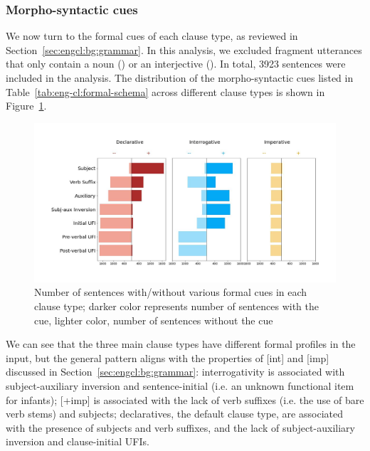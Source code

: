 \subsubsection{Morpho-syntactic cues}
\label{sec:engcl:corpus:formal}
We now turn to the formal cues of each clause type, as reviewed in Section~\ref{sec:engcl:bg:grammar}. In this analysis, we excluded fragment utterances that only contain a noun () or an interjective (). In total, 3923 sentences were included in the analysis. The distribution of the morpho-syntactic cues listed in Table~\ref{tab:eng-cl:formal-schema} across different clause types is shown in Figure~\ref{fig:real-syncluster}. %





\begin{figure}[H]
    \centering
    \includegraphics[width=1\textwidth]{figures/real-syncluster.jpg}
    \caption{Number of sentences with/without various formal cues in each clause type; darker color represents number of sentences with the cue, lighter color, number of sentences without the cue }
    \label{fig:real-syncluster}
\end{figure}

We can see that the three main clause types have different formal profiles in the input, but the general pattern aligns with the properties of [\textpm int] and [\textpm imp] discussed in Section~\ref{sec:engcl:bg:grammar}: interrogativity is associated with subject-auxiliary inversion and sentence-initial \twh{} (i.e. an unknown functional item for infants); [+imp] is associated with the lack of verb suffixes (i.e. the use of bare verb stems) and subjects; declaratives, the default clause type, are associated with the presence of subjects and verb suffixes, and the lack of subject-auxiliary inversion and clause-initial UFIs. 

